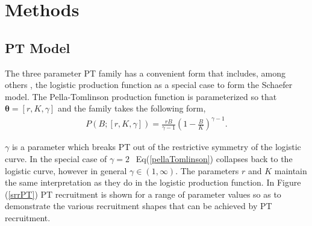 \documentclass[12pt]{article}
\begin{document}
%



%
\clearpage
\section{Methods}


%
\subsection{PT Model}

The three parameter PT family has a convenient form that includes, among 
others , the 
logistic production function as a special case to form the Schaefer model. The 
Pella-Tomlinson production function is parameterized so that $\bm{\theta} = [r, K, \gamma]$ 
and the family takes the following form, 
\begin{align}
P(B; [r, K, \gamma]) = \frac{r B}{\gamma-1} \left(1-\frac{B}{K}\right)^{\gamma-1}. \label{pellaTomlinson}
\end{align}
%

%
$\gamma$ is a parameter which breaks PT out of the restrictive symmetry of the 
logistic curve. In the special case of $\gamma=2~~$ Eq(\ref{pellaTomlinson}) 
collapses back to the logistic curve, however in general $\gamma\in(1, \infty)$.
The parameters $r$ and $K$ maintain the same interpretation as 
they do in the logistic production function. In Figure (\ref{srrPT}) PT recruitment 
is shown for a range of parameter values so as to demonstrate the various 
recruitment shapes that can be achieved by PT recruitment.  
\end{document}

